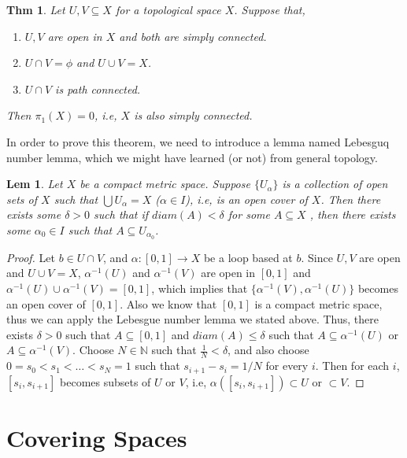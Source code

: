 \documentclass[paper=a4, fontsize=11pt]{scrartcl}
\newtheorem{theorem}{Thm}
\newtheorem{lemma}{Lem}
\begin{document}
\begin{theorem}Let $U,V \subseteq X$ for a topological space $X$. Suppose that,
	\begin{enumerate}
		\item $U,V $ are open in $X$ and both are simply connected.
		\item $U \cap V = \phi$ and $U \cup V = X$.
		\item $U \cap V$ is path connected. 
	\end{enumerate}	
	Then $\pi_1(X)=0$, i.e, $X$ is also simply connected.
\end{theorem}

In order to prove this theorem, we need to introduce a lemma named Lebesguq number lemma, which we might have learned (or not) from general topology. \\

\begin{lemma}
	Let $X$ be a compact metric space. Suppose $\{U_\alpha \}$ is a collection of open sets of $X$ such that $\bigcup U_\alpha = X$ ($\alpha \in I$), i.e, is an open cover of $X$. Then there exists some $\delta >0$ such that if $diam(A) < \delta$ for some $A \subseteq X$ , then there exists some $\alpha_0 \in I $ such that $A \subseteq U_{\alpha_0}$. \\
\end{lemma}

\begin{proof}
	Let $b \in U \cap V$, and $\alpha : [0,1] \to X $ be a loop based at $b$. Since $U,V$ are open and $U \cup V = X$, $\alpha^{-1}(U)$ and $\alpha^{-1}(V)$ are open in $[0,1] $ and $\alpha^{-1}(U) \cup \alpha^{-1}(V) = [0,1]$, which implies that $\{ \alpha^{-1}(V) , \alpha^{-1}(U)\}$ becomes an open cover of $[0,1]$. Also we know that $[0,1]$ is a compact metric space, thus we can apply the Lebesgue number lemma we stated above. Thus, there exists $\delta > 0$ such that $A \subseteq [0,1]$ and $diam(A)\leq \delta$ such that $A \subseteq \alpha^{-1}(U)$ or $A \subseteq \alpha^{-1}(V)$. Choose $N \in \mathbb{N}$ such that $\frac{1}{N} < \delta$, and also choose $0= s_0 < s_1 < \dots < s_N=1$ such that $s_{i+1}-s_i=1/N$ for every $i$. Then for each $i$, $[s_i,s_{i+1}]$ becomes subsets of $U$ or $V$, i.e, $\alpha([s_i,s_{i+1}])\subset U$ or $\subset V$.
\end{proof}

\section{Covering Spaces}
\end{document}
